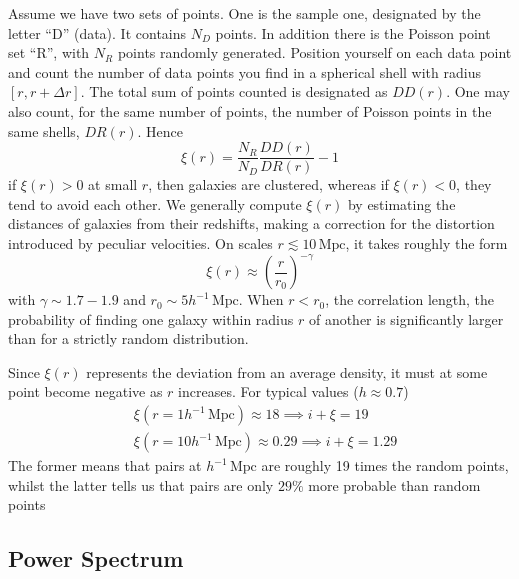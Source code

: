 \par Assume we have two sets of points. One is the sample one, designated by the letter “D” (data). It contains $N_{D}$ points. In addition there is the Poisson point set “R”, with $N_{R}$ points randomly generated. Position yourself on each data point and count the number of data points you find in a spherical shell with radius $[r, r + \Delta r]$. The total sum of points counted is designated as $DD(r)$. One may also count, for the same number of points, the number of Poisson points in the same shells, $DR(r)$.
Hence
\begin{equation*}
    \xi(r) = \frac{N_{R}}{N_{D}}\frac{DD(r)}{DR(r)}-1
\end{equation*}
if $\xi(r) > 0$ at small $r$, then galaxies are clustered, whereas if $\xi(r)<0$, they tend to avoid each other. We generally compute $\xi(r)$ by estimating the distances of galaxies from their redshifts, making a correction for the distortion introduced by peculiar velocities. On scales $r \lesssim 10\,\text{Mpc}$, it takes roughly the form
\begin{equation*}
    \xi(r)\approx \left(\frac{r}{r_{0}}\right)^{-\gamma}
\end{equation*}
with $\gamma \sim 1.7-1.9$ and $r_{0}\sim 5h^{-1}\,\text{Mpc}$. When $r<r_{0}$, the correlation length, the probability of finding one galaxy within radius $r$ of another is significantly larger than for a strictly random distribution.
\par Since $\xi(r)$ represents the deviation from an average density, it must at some point become negative as $r$ increases. For typical values ($h\approx 0.7$)
\begin{align*}
    &\xi(r = 1h^{-1}\,\text{Mpc}) \approx 18 \implies i+\xi = 19\\
    &\xi(r = 10h^{-1}\,\text{Mpc}) \approx 0.29 \implies i+\xi = 1.29
\end{align*}
The former means that pairs at $h^{-1}\,\text{Mpc}$ are roughly 19 times the random points, whilst the latter tells us that pairs are only $29\%$ more probable than random points

\subsection{Power Spectrum}

